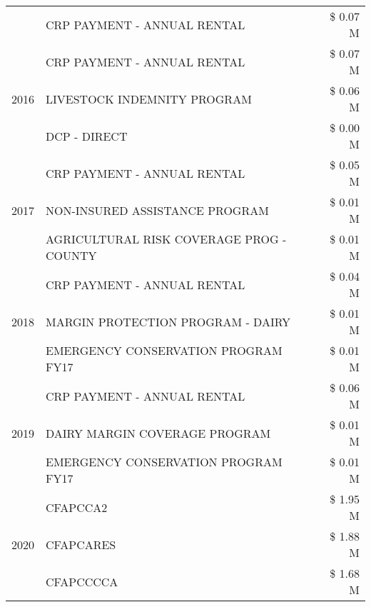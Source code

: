 \begin{tabular}{llr}
 & CRP PAYMENT - ANNUAL RENTAL & \$ 0.07 M \\
\cline{1-3}
\multirow[t]{3}{*}{2016} & CRP PAYMENT - ANNUAL RENTAL & \$ 0.07 M \\
 & LIVESTOCK INDEMNITY PROGRAM & \$ 0.06 M \\
 & DCP - DIRECT & \$ 0.00 M \\
\cline{1-3}
\multirow[t]{3}{*}{2017} & CRP PAYMENT - ANNUAL RENTAL & \$ 0.05 M \\
 & NON-INSURED ASSISTANCE PROGRAM & \$ 0.01 M \\
 & AGRICULTURAL RISK COVERAGE PROG - COUNTY & \$ 0.01 M \\
\cline{1-3}
\multirow[t]{3}{*}{2018} & CRP PAYMENT - ANNUAL RENTAL & \$ 0.04 M \\
 & MARGIN PROTECTION PROGRAM - DAIRY & \$ 0.01 M \\
 & EMERGENCY CONSERVATION PROGRAM FY17 & \$ 0.01 M \\
\cline{1-3}
\multirow[t]{3}{*}{2019} & CRP PAYMENT - ANNUAL RENTAL & \$ 0.06 M \\
 & DAIRY MARGIN COVERAGE PROGRAM & \$ 0.01 M \\
 & EMERGENCY CONSERVATION PROGRAM FY17 & \$ 0.01 M \\
\cline{1-3}
\multirow[t]{3}{*}{2020} & CFAPCCA2 & \$ 1.95 M \\
 & CFAPCARES & \$ 1.88 M \\
 & CFAPCCCCA & \$ 1.68 M \\
\cline{1-3}
\bottomrule
\end{tabular}
